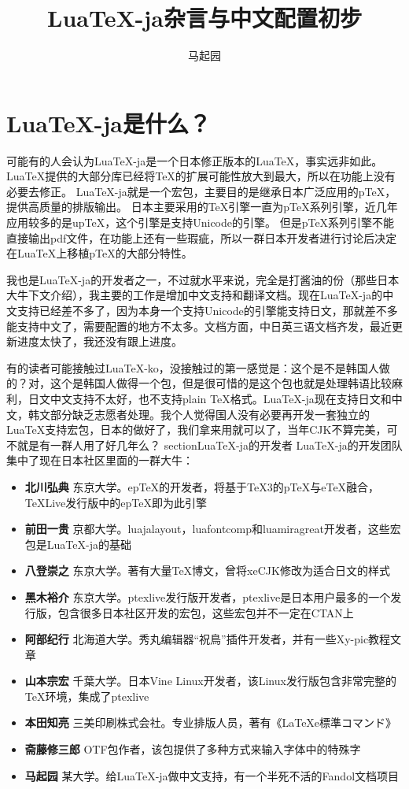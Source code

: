 \documentclass{article}
\title{LuaTeX-ja杂言与中文配置初步}
\author{马起园}
\begin{document}
\maketitle
\section{LuaTeX-ja是什么？}
可能有的人会认为LuaTeX-ja是一个日本修正版本的LuaTeX，事实远非如此。
LuaTeX提供的大部分库已经将TeX的扩展可能性放大到最大，所以在功能上没有必要去修正。
LuaTeX-ja就是一个宏包，主要目的是继承日本广泛应用的pTeX，提供高质量的排版输出。
日本主要采用的TeX引擎一直为pTeX系列引擎，近几年应用较多的是upTeX，这个引擎是支持Unicode的引擎。
但是pTeX系列引擎不能直接输出pdf文件，在功能上还有一些瑕疵，所以一群日本开发者进行讨论后决定在LuaTeX上移植pTeX的大部分特性。

我也是LuaTeX-ja的开发者之一，不过就水平来说，完全是打酱油的份（那些日本大牛下文介绍），我主要的工作是增加中文支持和翻译文档。现在LuaTeX-ja的中文支持已经差不多了，因为本身一个支持Unicode的引擎能支持日文，那就差不多能支持中文了，需要配置的地方不太多。文档方面，中日英三语文档齐发，最近更新进度太快了，我还没有跟上进度。

有的读者可能接触过LuaTeX-ko，没接触过的第一感觉是：这个是不是韩国人做的？对，这个是韩国人做得一个包，但是很可惜的是这个包也就是处理韩语比较麻利，日文中文支持不太好，也不支持plain TeX格式。LuaTeX-ja现在支持日文和中文，韩文部分缺乏志愿者处理。我个人觉得国人没有必要再开发一套独立的LuaTeX支持宏包，日本的做好了，我们拿来用就可以了，当年CJK不算完美，可不就是有一群人用了好几年么？
section{LuaTeX-ja的开发者}
LuaTeX-ja的开发团队集中了现在日本社区里面的一群大牛：
\begin{itemize}
\item \textbf{北川弘典} 东京大学。epTeX的开发者，将基于TeX3的pTeX与eTeX融合，TeXLive发行版中的epTeX即为此引擎
\item \textbf{前田一贵} 京都大学。luajalayout，luafontcomp和luamiragreat开发者，这些宏包是LuaTeX-ja的基础
\item \textbf{八登崇之} 东京大学。著有大量TeX博文，曾将xeCJK修改为适合日文的样式
\item \textbf{黑木裕介} 东京大学。ptexlive发行版开发者，ptexlive是日本用户最多的一个发行版，包含很多日本社区开发的宏包，这些宏包并不一定在CTAN上
\item \textbf{阿部纪行} 北海道大学。秀丸编辑器“祝鳥”插件开发者，并有一些Xy-pic教程文章
\item \textbf{山本宗宏} 千葉大学。日本Vine Linux开发者，该Linux发行版包含非常完整的TeX环境，集成了ptexlive
\item \textbf{本田知亮} 三美印刷株式会社。专业排版人员，著有《LaTeXe標準コマンド》
\item \textbf{斋藤修三郎} OTF包作者，该包提供了多种方式来输入字体中的特殊字
\item \textbf{马起园} 某大学。给LuaTeX-ja做中文支持，有一个半死不活的Fandol文档项目
\end{itemize}
\end{document}
